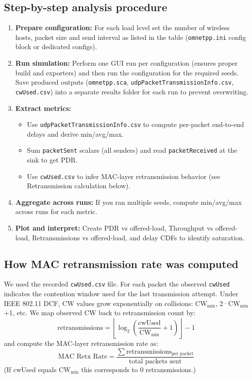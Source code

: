 \documentclass{rapport}
\begin{document}
\subsection{Step-by-step analysis procedure}
\begin{enumerate}
  \item \textbf{Prepare configuration:} For each load level set the number of wireless hosts, packet size and send interval as listed in the table (\texttt{omnetpp.ini} config block or dedicated configs).
  \item \textbf{Run simulation:} Perform one GUI run per configuration (ensures proper build and exporters) and then run the configuration for the required seeds. Save produced outputs (\texttt{omnetpp.sca}, \texttt{udpPacketTransmissionInfo.csv}, \texttt{cwUsed.csv}) into a separate results folder for each run to prevent overwriting.
  \item \textbf{Extract metrics:}
    \begin{itemize}
      \item Use \texttt{udpPacketTransmissionInfo.csv} to compute per-packet end-to-end delays and derive min/avg/max.
      \item Sum \texttt{packetSent} scalars (all senders) and read \texttt{packetReceived} at the sink to get PDR.
      \item Use \texttt{cwUsed.csv} to infer MAC-layer retransmission behavior (see Retransmission calculation below).
    \end{itemize}
  \item \textbf{Aggregate across runs:} If you ran multiple seeds, compute min/avg/max across runs for each metric.
  \item \textbf{Plot and interpret:} Create PDR vs offered-load, Throughput vs offered-load, Retransmissions vs offered-load, and delay CDFs to identify saturation.
\end{enumerate}

\subsection{How MAC retransmission rate was computed}
We used the recorded \texttt{cwUsed.csv} file. For each packet the observed \texttt{cwUsed} indicates the contention window used for the last transmission attempt. Under IEEE 802.11 DCF, CW values grow exponentially on collisions: CW$_{\text{min}}$, 2·CW$_{\text{min}}$+1, etc. We map observed CW back to retransmission count by:
\[
\text{retransmissions} = \left\lfloor \log_2\!\left(\frac{\text{cwUsed}}{\text{CW}_{\min}} + 1\right) \right\rfloor - 1
\]
and compute the MAC-layer retransmission rate as:
\[
\text{MAC Retx Rate} = \frac{\sum \text{retransmissions}_{\text{per packet}}}{\text{total packets sent}}
\]
(If cwUsed equals CW$_{\min}$ this corresponds to 0 retransmissions.)
\end{document}
